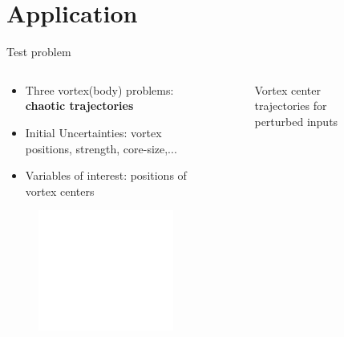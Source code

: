 \documentclass[aspectratio=169]{beamer} %
\begin{document}
\section{Application}


\begin{frame}{Test problem}
    \vspace{-0.5cm}
    \begin{columns}[t]
        \begin{column}{0.45\textwidth}
            \begin{itemize}
                \item \scriptsize Three vortex(body) problems: \textbf{chaotic trajectories}~\footnotemark[1]
                \item \scriptsize Initial Uncertainties: vortex positions, strength, core-size,...
                \item \scriptsize Variables of interest: positions of vortex centers
            \end{itemize}
            \begin{figure}
                \centering
                \vspace{-0.25cm}
                \includegraphics<2->[width=\textwidth]{images/error_position_wo_assim.pdf}
            \end{figure}
            \vfill
        \end{column}
        \begin{column}{0.55\textwidth}
            \centering
            \vspace{-1.0cm}
            \begin{figure}[t]
                \centering
                \caption*{\tiny Vortex center trajectories for perturbed inputs}
            \end{figure}
            \vfill


\end{column}
\end{columns}
\end{frame}
\end{document}
